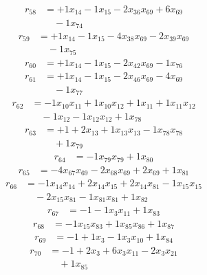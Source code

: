 \[\begin{aligned}
r_{58} &= + 1 x_{14} - 1 x_{15} - 2 x_{36} x_{69} + 6 x_{69} \\
 &\quad - 1 x_{74}
\end{aligned}\]
\[\begin{aligned}
r_{59} &= + 1 x_{14} - 1 x_{15} - 4 x_{38} x_{69} - 2 x_{39} x_{69} \\
 &\quad - 1 x_{75}
\end{aligned}\]
\[\begin{aligned}
r_{60} &= + 1 x_{14} - 1 x_{15} - 2 x_{42} x_{69} - 1 x_{76}
\end{aligned}\]
\[\begin{aligned}
r_{61} &= + 1 x_{14} - 1 x_{15} - 2 x_{46} x_{69} - 4 x_{69} \\
 &\quad - 1 x_{77}
\end{aligned}\]
\[\begin{aligned}
r_{62} &= - 1 x_{10} x_{11} + 1 x_{10} x_{12} + 1 x_{11} + 1 x_{11} x_{12} \\
 &\quad - 1 x_{12} - 1 x_{12} x_{12} + 1 x_{78}
\end{aligned}\]
\[\begin{aligned}
r_{63} &= + 1 + 2 x_{13} + 1 x_{13} x_{13} - 1 x_{78} x_{78} \\
 &\quad + 1 x_{79}
\end{aligned}\]
\[\begin{aligned}
r_{64} &= - 1 x_{79} x_{79} + 1 x_{80}
\end{aligned}\]
\[\begin{aligned}
r_{65} &= - 4 x_{67} x_{69} - 2 x_{68} x_{69} + 2 x_{69} + 1 x_{81}
\end{aligned}\]
\[\begin{aligned}
r_{66} &= - 1 x_{14} x_{14} + 2 x_{14} x_{15} + 2 x_{14} x_{81} - 1 x_{15} x_{15} \\
 &\quad - 2 x_{15} x_{81} - 1 x_{81} x_{81} + 1 x_{82}
\end{aligned}\]
\[\begin{aligned}
r_{67} &= - 1 - 1 x_{3} x_{11} + 1 x_{83}
\end{aligned}\]
\[\begin{aligned}
r_{68} &= - 1 x_{15} x_{83} + 1 x_{85} x_{86} + 1 x_{87}
\end{aligned}\]
\[\begin{aligned}
r_{69} &= - 1 + 1 x_{3} - 1 x_{3} x_{10} + 1 x_{84}
\end{aligned}\]
\[\begin{aligned}
r_{70} &= - 1 + 2 x_{3} + 6 x_{3} x_{11} - 2 x_{3} x_{21} \\
 &\quad + 1 x_{85}
\end{aligned}\]
